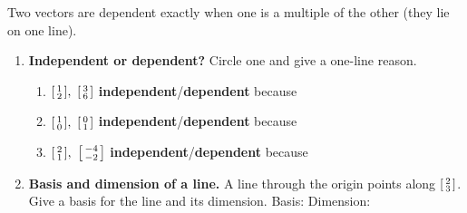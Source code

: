 \documentclass[10pt]{article}
\begin{document}
\begin{tcolorbox}[colback=white, colframe=black!40, title=\textbf{Tier R --- Remediate},
    fonttitle=\bfseries, arc=1.5mm, left=3mm, right=3mm, top=2mm, bottom=2mm, breakable]
Two vectors are dependent exactly when one is a multiple of the other (they lie on one line).
\begin{enumerate}[leftmargin=1.7em, itemsep=8pt]
  \item \textbf{Independent or dependent?} Circle one and give a one-line reason.
    \begin{enumerate}[label=(\alph*), leftmargin=1.8em, itemsep=5pt]
      \item $\begin{bsmallmatrix} 1\\2 \end{bsmallmatrix},\ \begin{bsmallmatrix} 3\\6 \end{bsmallmatrix}$ \quad \textbf{independent}/\textbf{dependent} \quad because \blank{4.5cm}
      \item $\begin{bsmallmatrix} 1\\0 \end{bsmallmatrix},\ \begin{bsmallmatrix} 0\\1 \end{bsmallmatrix}$ \quad \textbf{independent}/\textbf{dependent} \quad because \blank{4.5cm}
      \item $\begin{bsmallmatrix} 2\\1 \end{bsmallmatrix},\ \begin{bsmallmatrix} -4\\-2 \end{bsmallmatrix}$ \quad \textbf{independent}/\textbf{dependent} \quad because \blank{4.5cm}
    \end{enumerate}
  \item \textbf{Basis and dimension of a line.} A line through the origin points along
        $\begin{bsmallmatrix} 2\\3 \end{bsmallmatrix}$. Give a basis for the line and its dimension.
        \; Basis: \blank{2.2cm} \quad Dimension: \blank{1.2cm}
\end{enumerate}
\end{tcolorbox}
\end{document}
